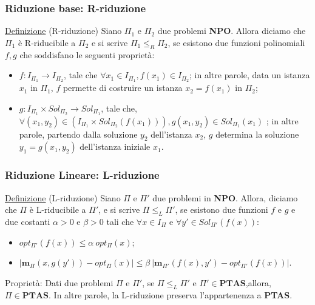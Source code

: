 \documentclass{beamer}
\begin{document}
\begin{frame}
    \frametitle{Riduzione base: R-riduzione}
    \begin{block}{\underline{Definizione} (R-riduzione)}
        Siano $\Pi_1$ e $\Pi_2$ due problemi \textbf{NPO}. Allora diciamo che $\Pi_1$ è R-riducibile a $\Pi_2$ e si scrive $\Pi_1 \leq_R \Pi_2$, se esistono due funzioni polinomiali $f, g$ che soddisfano le seguenti proprietà:
        \begin{itemize}
         \item $f: I_{\Pi_1}\rightarrow I_{\Pi_2} $, tale che $\forall x_1 \in I_{\Pi_1}, f(x_1)\in I_{\Pi_2}$;  in altre parole, data un istanza $x_1$ in $\Pi_1$, $f$ permette di costruire un istanza $x_2 = f(x_1)$ in $\Pi_2$;
         \item $g:I_{\Pi_1} \times Sol_{\Pi_2} \rightarrow Sol_{\Pi_1}$, tale che, $\forall (x_1, y_2)\in(I_{\Pi_1} \times Sol_{\Pi_2}(f(x_1))), g(x_1, y_2)\in Sol_{\Pi_1}(x_1)$ ; in altre parole, partendo dalla soluzione $y_2$ dell'istanza $x_2$, $g$ determina la soluzione $y_1 = g(x_1, y_2)$ dell'istanza iniziale $x_1$. 
        \end{itemize}
    \end{block}
\end{frame}

% 

\begin{frame}
    \frametitle{Riduzione Lineare: L-riduzione}
    \begin{block}{\underline{Definizione} (L-riduzione)}
        Siano $\Pi$ e $\Pi'$ due problemi in \textbf{NPO}. Allora, diciamo che $\Pi$ è L-riducibile a $\Pi'$, e si scrive $\Pi \leq_L \Pi'$, se esistono due funzioni $f$ e $g$ e due costanti $\alpha > 0$ e $\beta > 0$ tali che $\forall x \in I_{\Pi}$ e $\forall y' \in Sol_{\Pi'}(f(x))$:
        \begin{itemize}
         \item $opt_{\Pi'}(f(x)) \leq \alpha\ opt_{\Pi}(x)$;
         \item $|\textbf{m}_{\Pi}(x, g(y'))- opt_{\Pi}(x)| \leq \beta\ |\textbf{m}_{\Pi'}(f(x), y') - opt_{\Pi'}(f(x))|$.
        \end{itemize}
    \end{block}
    \begin{block}{Proprietà:}
        Dati due problemi $\Pi$ e $\Pi'$, se $\Pi \leq_L \Pi'$ e 
        $\Pi' \in \textbf{PTAS}$,allora, $\Pi \in \textbf{PTAS}$. In altre parole, la L-riduzione preserva l'appartenenza a \textbf{PTAS}.
    \end{block}

    
\end{frame}
\end{document}
